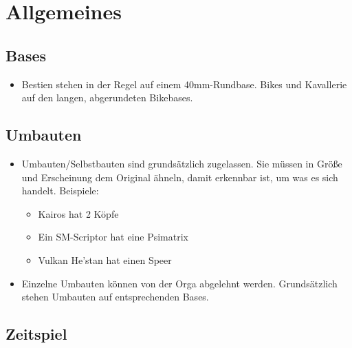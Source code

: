 \section{Allgemeines} 

\subsection{Bases}

\begin{itemize}

\item Bestien stehen in der Regel auf einem 40mm-Rundbase. Bikes und Kavallerie
 auf den langen, abgerundeten Bikebases.

\end{itemize}

\subsection{Umbauten}

\begin{itemize}

 \item Umbauten/Selbstbauten sind grundsätzlich zugelassen. Sie müssen in Größe
  und Erscheinung dem Original ähneln, damit erkennbar ist, um was es sich
  handelt.
 Beispiele:
\begin{itemize}
 \item Kairos hat 2 Köpfe
 \item Ein SM-Scriptor hat eine Psimatrix
 \item Vulkan He'stan hat einen Speer
\end{itemize}

\item Einzelne Umbauten können von der Orga abgelehnt werden. Grundsätzlich
 stehen Umbauten  auf entsprechenden Bases.

\end{itemize}

\subsection{Zeitspiel}

